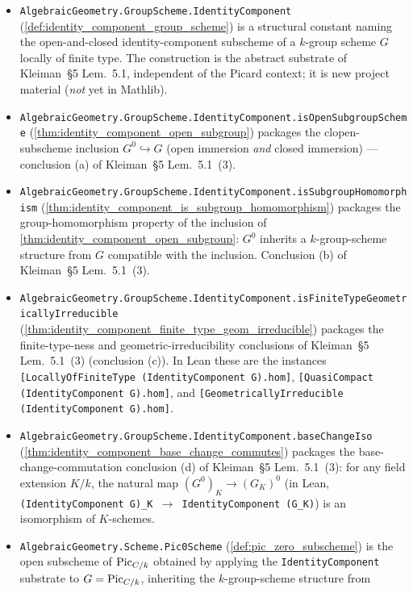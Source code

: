 \begin{itemize}
  \item \texttt{AlgebraicGeometry.GroupScheme.IdentityComponent}
    (\cref{def:identity_component_group_scheme}) is a structural
    constant naming the open-and-closed identity-component subscheme
    of a \(k\)-group scheme \(G\) locally of finite type. The construction
    is the abstract substrate of Kleiman~\S 5 Lem.~5.1,
    independent of the Picard context; it is new project material
    (\emph{not} yet in Mathlib).
  \item \texttt{AlgebraicGeometry.GroupScheme.IdentityComponent.isOpenSubgroupScheme}
    (\cref{thm:identity_component_open_subgroup}) packages the
    clopen-subscheme inclusion \(G^0 \hookrightarrow G\) (open immersion
    \emph{and} closed immersion) --- conclusion (a) of Kleiman~\S 5
    Lem.~5.1~(3).
  \item \texttt{AlgebraicGeometry.GroupScheme.IdentityComponent.isSubgroupHomomorphism}
    (\cref{thm:identity_component_is_subgroup_homomorphism}) packages
    the group-homomorphism property of the inclusion of
    \cref{thm:identity_component_open_subgroup}: \(G^0\) inherits a
    \(k\)-group-scheme structure from \(G\) compatible with the
    inclusion. Conclusion (b) of Kleiman~\S 5 Lem.~5.1~(3).
  \item \texttt{AlgebraicGeometry.GroupScheme.IdentityComponent.isFiniteTypeGeometricallyIrreducible}
    (\cref{thm:identity_component_finite_type_geom_irreducible})
    packages the finite-type-ness and geometric-irreducibility
    conclusions of Kleiman~\S 5 Lem.~5.1~(3) (conclusion (c)).
    In Lean these are the instances
    \texttt{[LocallyOfFiniteType (IdentityComponent G).hom]},
    \texttt{[QuasiCompact (IdentityComponent G).hom]}, and
    \texttt{[GeometricallyIrreducible (IdentityComponent G).hom]}.
  \item \texttt{AlgebraicGeometry.GroupScheme.IdentityComponent.baseChangeIso}
    (\cref{thm:identity_component_base_change_commutes}) packages the
    base-change-commutation conclusion (d) of Kleiman~\S 5
    Lem.~5.1~(3): for any field extension \(K/k\), the natural
    map \((G^0)_K \to (G_K)^0\) (in Lean,
    \texttt{(IdentityComponent G)\_K \(\to\) IdentityComponent (G\_K)})
    is an isomorphism of \(K\)-schemes.
  \item \texttt{AlgebraicGeometry.Scheme.Pic0Scheme}
    (\cref{def:pic_zero_subscheme}) is the open subscheme of
    \(\operatorname{Pic}_{C/k}\) obtained by applying the
    \texttt{IdentityComponent} substrate to
    \(G = \operatorname{Pic}_{C/k}\), inheriting the \(k\)-group-scheme structure from

\end{itemize}
